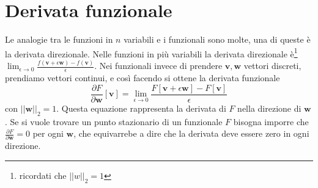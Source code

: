 \documentclass[11pt,a4paper]{report}
\newcommand{\vettore}[1]{\mathbf{#1}}
\theoremstyle{definition}
\theoremstyle{plain}
\theoremstyle{plain}
\begin{document}
		\section{Derivata funzionale}
			Le analogie tra le funzioni in $n$ variabili e i funzionali sono molte, una di queste è la derivata direzionale.\newline
			Nelle funzioni in più variabili la derivata direzionale è\footnote{ricordati che $||w||_2=1$} $\lim_{\epsilon \to 0}\frac{f(\vettore v+\epsilon\vettore w)-f(\vettore v)}{\epsilon}$. Nei funzionali invece di prendere $\vettore v,\vettore w$ vettori discreti, prendiamo vettori continui, e così facendo si ottene la derivata funzionale
			\begin{equation}
				\frac{\partial F}{\partial \vettore w}[\vettore v]=\lim_{\epsilon \to 0}\frac{F[\vettore v+\epsilon \vettore w]-F[\vettore v]}{\epsilon}
			\end{equation}
			con $||\vettore w||_2=1$. Questa equazione rappresenta la derivata di $F$ nella direzione di $\vettore w$.\newline
			Se si vuole trovare un punto stazionario di un funzionale $F$ bisogna imporre che $\frac{\partial F}{\partial \vettore w}=0$ per ogni $\vettore w$, che equivarrebe a dire che la derivata deve essere zero in ogni direzione.\newline
\end{document}
